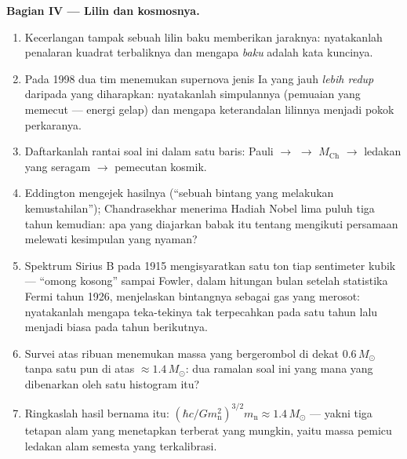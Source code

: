 \begin{problem}
\medskip\noindent\textbf{Bagian IV --- Lilin dan
kosmosnya.}
\begin{enumerate}[resume]
  \item Kecerlangan tampak sebuah lilin baku memberikan jaraknya:
        nyatakanlah penalaran kuadrat terbaliknya dan mengapa
        \emph{baku} adalah kata kuncinya.
  \item Pada 1998 dua tim menemukan supernova jenis Ia yang jauh
        \emph{lebih redup} daripada yang diharapkan: nyatakanlah
        simpulannya (pemuaian yang memecut --- energi gelap) dan mengapa
        keterandalan lilinnya menjadi pokok perkaranya.
  \item Daftarkanlah rantai soal ini dalam satu baris: Pauli $\to$
         $\to$ $M_{\text{Ch}}$ $\to$ ledakan yang
        seragam $\to$ pemecutan kosmik.
  \item Eddington mengejek hasilnya (``sebuah bintang yang melakukan
        kemustahilan''); Chandrasekhar menerima Hadiah Nobel lima puluh
        tiga tahun kemudian: apa yang diajarkan babak itu tentang
        mengikuti persamaan melewati kesimpulan yang nyaman?
  \item Spektrum Sirius B pada 1915 mengisyaratkan satu ton tiap
        sentimeter kubik --- ``omong kosong'' sampai Fowler, dalam
        hitungan bulan setelah statistika Fermi tahun 1926, menjelaskan
        bintangnya sebagai gas yang merosot: nyatakanlah mengapa
        teka-tekinya tak terpecahkan pada satu tahun lalu menjadi biasa
        pada tahun berikutnya.
  \item Survei atas ribuan  menemukan massa yang
        bergerombol di dekat $0.6\,M_\odot$ tanpa satu pun di atas
        $\approx1.4\,M_\odot$: dua ramalan soal ini yang mana yang
        dibenarkan oleh satu histogram itu?
  \item Ringkaslah hasil bernama itu: $(\hbar c/Gm_{\text{n}}^2)^{
        3/2}m_{\text{n}} \approx 1.4\,M_\odot$ --- yakni tiga tetapan
        alam yang menetapkan  terberat yang mungkin, yaitu
        massa pemicu ledakan alam semesta yang terkalibrasi.
\end{enumerate}
\end{problem}
